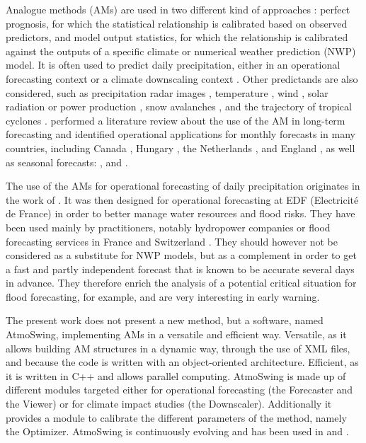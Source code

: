 \documentclass[review]{elsarticle}
\begin{document}
Analogue methods (AMs) are used in two different kind of approaches \citep{Rummukainen1997}: perfect prognosis, for which the statistical relationship is calibrated based on observed predictors, and model output statistics, for which the relationship is calibrated against the outputs of a specific climate or numerical weather prediction (NWP) model. It is often used to predict daily precipitation, either in an operational forecasting context \citep[e.g.][]{Guilbaud1997, Bontron2005, Hamill2006, Bliefernicht2010, Marty2012, Horton2012, Hamill2015, BenDaoud2016} or a climate downscaling context \citep[e.g.][]{Radanovics2013, Chardon2014, Dayon2015, Raynaud2016b}. Other predictands are also considered, such as precipitation radar images \citep{Panziera2011,Foresti2015a}, temperature \citep{Radinovic1975, Woodcock1980, Kruizinga1983, DelleMonache2013, Caillouet2016, Raynaud2016b}, wind \citep{Gordon1987, DelleMonache2013, DelleMonache2011, Vanvyve2015, Alessandrini2015, Junk2015, Junk2015c}, solar radiation or power production \citep{Alessandrini2015a, Bessa2015, Raynaud2016b}, snow avalanches \citep{Obled1980, Bolognesi1993}, and the trajectory of tropical cyclones \citep{Keenan1981, Sievers2000, Fraedrich2003}. \citet{Guilbaud1997} performed a literature review about the use of the AM in long-term forecasting and identified operational applications for monthly forecasts in many countries, including Canada \citep{Shabbar1986},  Hungary \citep{Toth1989}, the Netherlands \citep{Nap1981}, and England \citep{Murray1974}, as well as seasonal forecasts: \citet{Barnett1978}, \citet{Bergen1982} and \citet{Livezey1988}.

The use of the AMs for operational forecasting of daily precipitation originates in the work of \citet{Duband1970, Duband1974, Duband1981}. It was then designed for operational forecasting at EDF (Electricit\'{e} de France) in order to better manage water resources and flood risks. They have been used mainly by practitioners, notably hydropower companies \citep{Desaint2008a,BenDaoud2009,Obled2014} or flood forecasting services in France and Switzerland \citep{Marty2010,GarciaHernandez2009b,Horton2012}. They should however not be considered as a substitute for NWP models, but as a complement in order to get a fast and partly independent forecast that is known to be accurate several days in advance. They therefore enrich the analysis of a potential critical situation for flood forecasting, for example, and are very interesting in early warning.

The present work does not present a new method, but a software, named AtmoSwing, implementing AMs in a versatile and efficient way. Versatile, as it allows building AM structures in a dynamic way, through the use of XML files, and because the code is written with an object-oriented architecture. Efficient, as it is written in C++ and allows parallel computing. AtmoSwing is made up of different modules targeted either for operational forecasting (the Forecaster and the Viewer) or for climate impact studies (the Downscaler). Additionally it provides a module to calibrate the different parameters of the method, namely the Optimizer. AtmoSwing is continuously evolving and has been used in \citet{Horton2012, Horton2017a, Horton2017b, Horton2018a} and \citet{Horton2018b}.
\end{document}
